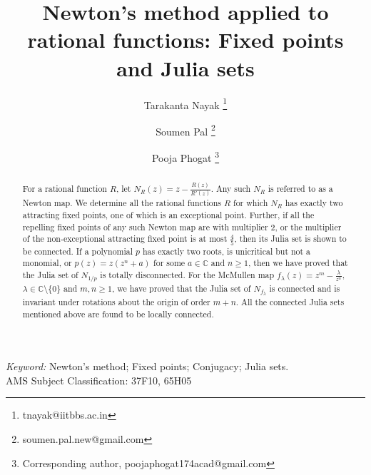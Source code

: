\documentclass[12pt]{article}
\date{}
\numberwithin{equation}{section}
\begin{document}
\title{Newton's method applied to rational functions: Fixed points and Julia sets}
\author[1]{Tarakanta Nayak 
    \footnote{tnayak@iitbbs.ac.in}}
\author[2]{Soumen Pal \footnote{soumen.pal.new@gmail.com}}
\author[1]{Pooja Phogat  \footnote{Corresponding author, poojaphogat174acad@gmail.com}}
	\date{}
\maketitle
\begin{abstract}
For a rational function  $R$, let  
$N_R(z)=z-\frac{R(z)}{R'(z)}.$ Any such $N_R$ is referred to as a  Newton map. We determine all the rational functions $R$ for which $N_R$ has exactly two attracting fixed points, one of which is an exceptional point. Further, if all the repelling fixed points of any such Newton map are with multiplier $2$, or the multiplier of the non-exceptional attracting fixed point is at most $\frac{4}{5}$, then its Julia set is shown to be connected.  
If a polynomial $p$ has exactly two roots, is unicritical but not a monomial, or $p(z)=z(z^n+a)$ for some $a \in \mathbb{C}$ and $n \geq 1$, then we have proved that the Julia set of $N_{1/p}$ is totally disconnected. For the McMullen map $f_{\lambda}(z)=z^m - \frac{\lambda}{z^n}$, $\lambda \in \mathbb{C}\setminus \{0\}$ and $m,n \geq 1$, we have proved that the Julia set of $N_{f_\lambda}$ is connected and is invariant under rotations about the origin of order $m+n$. All the connected Julia sets mentioned above are found to be locally connected.
\end{abstract}
\textit{Keyword:}
Newton's method; Fixed points; Conjugacy; Julia sets.\\
AMS Subject Classification: 37F10, 65H05
\end{document}
